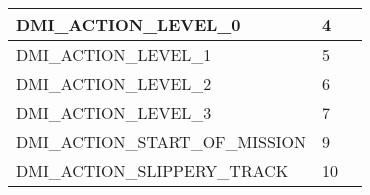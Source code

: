 \documentclass{template/openetcs_article}
\begin{document}
\begin{longtable}{|l|l|l|}
		\begin{minipage}[t]{0.60\linewidth}	DMI\_ACTION\_LEVEL\_0\end{minipage}
	&	\begin{minipage}[t]{0.15\linewidth} 4 	\end{minipage}
	&	\begin{minipage}[t]{0.30\linewidth} \end{minipage} \\
		\hline
		\begin{minipage}[t]{0.60\linewidth}	DMI\_ACTION\_LEVEL\_1\end{minipage}
	&	\begin{minipage}[t]{0.15\linewidth} 5 	\end{minipage}
	&	\begin{minipage}[t]{0.30\linewidth} \end{minipage}\\
		\hline
		\begin{minipage}[t]{0.60\linewidth}	DMI\_ACTION\_LEVEL\_2\end{minipage}
	&	\begin{minipage}[t]{0.15\linewidth} 6 	\end{minipage}
	&	\begin{minipage}[t]{0.30\linewidth} \end{minipage}\\
		\hline
		\begin{minipage}[t]{0.60\linewidth}	DMI\_ACTION\_LEVEL\_3\end{minipage}
	&	\begin{minipage}[t]{0.15\linewidth} 7 	\end{minipage}
	&	\begin{minipage}[t]{0.30\linewidth} \end{minipage}\\
		\hline
		\begin{minipage}[t]{0.60\linewidth}	DMI\_ACTION\_START\_OF\_MISSION\end{minipage}
	&	\begin{minipage}[t]{0.15\linewidth} 9 	\end{minipage}
	&	\begin{minipage}[t]{0.30\linewidth} \end{minipage}\\
		\hline
		\begin{minipage}[t]{0.60\linewidth}	DMI\_ACTION\_SLIPPERY\_TRACK\end{minipage}
	&	\begin{minipage}[t]{0.15\linewidth} 10 	\end{minipage}

\end{longtable}
\end{document}
